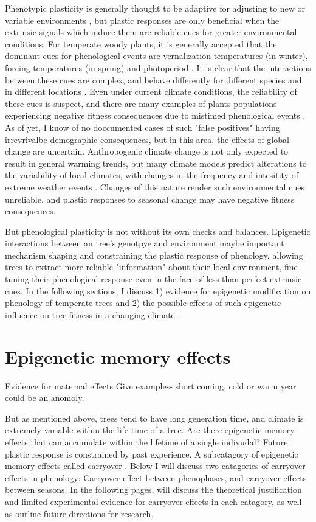 \documentclass{article}\usepackage[]{graphicx}\usepackage[]{color}
\begin{document}
\par  Phenotypic plasticity is generally thought to be adaptive for adjusting to new or variable environments \citep{}, but plastic responses are only beneficial when the extrinsic signals which induce them are reliable cues for greater environmental conditions. For temperate woody plants, it is generally accepted that the dominant cues for phenological events are vernalization temperatures (in winter), forcing temperatures (in spring) and photoperiod \citep{}. It is clear that the interactions between these cues are complex, and behave differently for different species and in different locations \citep{}. Even under current climate conditions, the reliability of these cues is suspect, and there are many examples of plants populations experiencing negative fitness consequences due to mistimed phenological events \cite{Inouye2008}. As of yet, I know of no doccumented cases of such "false positives" having irrevrivalbe demographic consequences, but in this area, the effects of global change are uncertain. Anthropogenic climate change is not only expected to result in general warming trends, but many climate models predict alterations to the variability of local climates, with changes in the frequency and intesitity of extreme weather events \citep{}. Changes of this nature render such environmental cues unreliable, and plastic responses to seasonal change may have negative fitness consequences.
\par But phenological plasticity is not without its own checks and balances. Epigenetic interactions between an tree's genotpye and environment maybe important mechanism shaping and constraining the plastic response of phenology, allowing trees to extract more reliable "information" about their local environment, fine-tuning their phenological response even in the face of less than perfect extrinsic cues. In the following sections, I discuss 1) evidence for epigenetic modification on phenology of temperate trees and 2) the possible effects of such epigenetic influence on tree fitness in a changing climate.
\section{Epigenetic memory effects}
Evidence for maternal effects
Give examples-
short coming, cold or warm year could be an anomoly.
\par But as mentioned above, trees tend to have long generation time, and climate is extremely variable within the life time of a tree. Are there epigenetic memory effects that can accumulate within the lifetime of a single indivudal? Future plastic response is constrained by past experience. A subcatagory of epigenetic memory effects called carryover \citep{O'Connor2014}. Below I will discuss two catagories of carryover effects in phenology: Carryover effect between phenophases, and carryover effects between seasons. In the following pages, will discuss the theoretical justification and limited experimental evidence for carryover effects in each catagory, as well as outline future directions for research.
\end{document}
